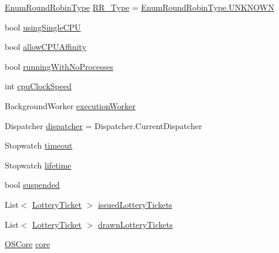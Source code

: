 \begin{DoxyCompactItemize}
\item 
\hyperlink{namespace_c_p_u___o_s___simulator_1_1_operating___system_a4c7effb8b6725df52018a3a14cede96e}{Enum\+Round\+Robin\+Type} \hyperlink{class_c_p_u___o_s___simulator_1_1_operating___system_1_1_scheduler_afa5f282549e500f0444d12048bdc31c9}{R\+R\+\_\+\+Type} = \hyperlink{namespace_c_p_u___o_s___simulator_1_1_operating___system_aea0b669d1bbf5690ae34ac2f8bef9470a696b031073e74bf2cb98e5ef201d4aa3}{Enum\+Round\+Robin\+Type.\+U\+N\+K\+N\+O\+W\+N}
\item 
bool \hyperlink{class_c_p_u___o_s___simulator_1_1_operating___system_1_1_scheduler_acd5c163fd74bd9e7ad4cbeb7f55c0338}{using\+Single\+C\+P\+U}
\item 
bool \hyperlink{class_c_p_u___o_s___simulator_1_1_operating___system_1_1_scheduler_a732d4b0d95cad3e280f9b69dd4f9f7c4}{allow\+C\+P\+U\+Affinity}
\item 
bool \hyperlink{class_c_p_u___o_s___simulator_1_1_operating___system_1_1_scheduler_af3276e8686d9efa7f8da6e48257922e3}{running\+With\+No\+Processes}
\item 
int \hyperlink{class_c_p_u___o_s___simulator_1_1_operating___system_1_1_scheduler_ae1829f5340f76cad2150c9e1f9ab3c69}{cpu\+Clock\+Speed}
\item 
Background\+Worker \hyperlink{class_c_p_u___o_s___simulator_1_1_operating___system_1_1_scheduler_a8b68cea278d24fcc12c6721210fe8dcb}{execution\+Worker}
\item 
Dispatcher \hyperlink{class_c_p_u___o_s___simulator_1_1_operating___system_1_1_scheduler_ab29898ad206dbc3a62234321cefe73ee}{dispatcher} = Dispatcher.\+Current\+Dispatcher
\item 
Stopwatch \hyperlink{class_c_p_u___o_s___simulator_1_1_operating___system_1_1_scheduler_adbb08b11d6d774001e688db129336719}{timeout}
\item 
Stopwatch \hyperlink{class_c_p_u___o_s___simulator_1_1_operating___system_1_1_scheduler_a765eabf93b7584d7d1476d18f283a85e}{lifetime}
\item 
bool \hyperlink{class_c_p_u___o_s___simulator_1_1_operating___system_1_1_scheduler_a844b64fe6c3917f055b61c4620995b74}{suspended}
\item 
List$<$ \hyperlink{class_c_p_u___o_s___simulator_1_1_operating___system_1_1_lottery_ticket}{Lottery\+Ticket} $>$ \hyperlink{class_c_p_u___o_s___simulator_1_1_operating___system_1_1_scheduler_a2cc17fd33517614da823a344f54cdd7c}{issued\+Lottery\+Tickets}
\item 
List$<$ \hyperlink{class_c_p_u___o_s___simulator_1_1_operating___system_1_1_lottery_ticket}{Lottery\+Ticket} $>$ \hyperlink{class_c_p_u___o_s___simulator_1_1_operating___system_1_1_scheduler_ac3e38df2939f98dd2e91b979329376ab}{drawn\+Lottery\+Tickets}
\item 
\hyperlink{class_c_p_u___o_s___simulator_1_1_operating___system_1_1_o_s_core}{O\+S\+Core} \hyperlink{class_c_p_u___o_s___simulator_1_1_operating___system_1_1_scheduler_ae49e3179fe53d59e3898adb9d0ff1827}{core}
\end{DoxyCompactItemize}


